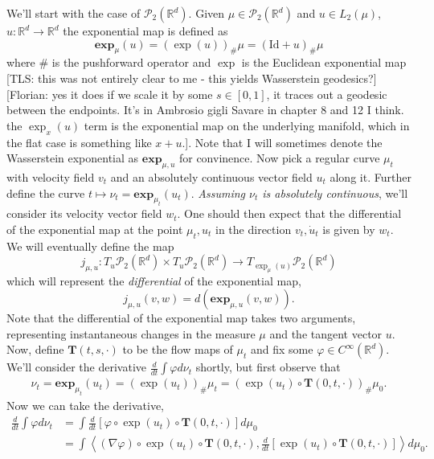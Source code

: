 \documentclass{article}
\newcommand{\ndfg}[1]{{\color{magenta}[Florian: #1]}}
\newcommand{\tls}[1]{{\color{cyan}[TLS: #1]}}
\begin{document}
We'll start with the case of $\mathcal{P}_2(\mathbb{R}^d)$. Given $\mu \in \mathcal{P}_2(\mathbb{R}^d)$ and $u \in L_2(\mu)$, $u:\mathbb{R}^d \rightarrow \mathbb{R}^d$ the exponential map is defined as 
\begin{equation}
    \mathbf{exp}_\mu(u) = (\exp(u))_\#\mu = (\text{Id} + u)_\#\mu
\end{equation}
where $\#$ is the pushforward operator and $\exp$ is the Euclidean exponential map \tls{this was not entirely clear to me - this yields Wasserstein geodesics?} \ndfg{yes it does if we scale it by some $s\in[0,1]$, it traces out a geodesic between the endpoints. It's in Ambrosio gigli Savare in chapter 8 and 12 I think. the $\exp_x(u)$ term is the exponential map on the underlying manifold, which in the flat case is something like $x+u$.}. Note that I will sometimes denote the Wasserstein exponential as $\mathbf{exp}_{\mu, u}$ for convinence. Now pick a regular curve $\mu_t$ with velocity field $v_t$ and an absolutely continuous vector field $u_t$ along it. Further define the curve $t \mapsto \nu_t = \mathbf{exp}_{\mu_t}(u_t)$. \textit{Assuming $\nu_t$ is absolutely continuous}, we'll consider its velocity vector field $w_t$. One should then expect that the differential of the exponential map at the point $\mu_t, u_t$ in the direction $v_t, \dot{u}_t$ is given by $w_t$. We will eventually define the map 
\[j_{\mu, u}: T_u \mathcal{P}_2(\mathbb{R}^d) \times T_u \mathcal{P}_2(\mathbb{R}^d) \rightarrow T_{\exp_{\mu}(u)} \mathcal{P}_2(\mathbb{R}^d) \]
which will represent the \textit{differential} of the exponential map,
\begin{equation}
    j_{\mu, u}(v, w) = d(\mathbf{exp}_{\mu, u}(v, w)).
\end{equation}
Note that the differential of the exponential map takes two arguments, representing instantaneous changes in the measure $\mu$ and the tangent vector $u$. Now, define $\mathbf{T}(t, s, \cdot)$ to be the flow maps of $\mu_t$ and fix some $\varphi \in C^{\infty}(\mathbb{R}^d)$. We'll consider the derivative $\frac{d}{dt}\int\varphi d\nu_t$ shortly, but first observe that
\begin{align}
    \nu_t = \mathbf{exp}_{\mu_t}(u_t) = (\exp(u_t))_\#\mu_t = (\exp(u_t) \circ \mathbf{T}(0,t, \cdot))_\#\mu_0.
\end{align}
Now we can take the derivative,
\begin{align}
    \frac{d}{dt}\int\varphi d\nu_t &= \int \frac{d}{dt}\left[\varphi\circ\exp(u_t) \circ \mathbf{T}(0, t, \cdot)\right] d\mu_0 \\
    &= \int \left\langle (\nabla\varphi) \circ \exp(u_t) \circ \mathbf{T}(0, t, \cdot), \frac{d}{dt} [\exp(u_t) \circ \mathbf{T}(0, t, \cdot)] \right\rangle  d\mu_0.
\end{align} 
\end{document}
